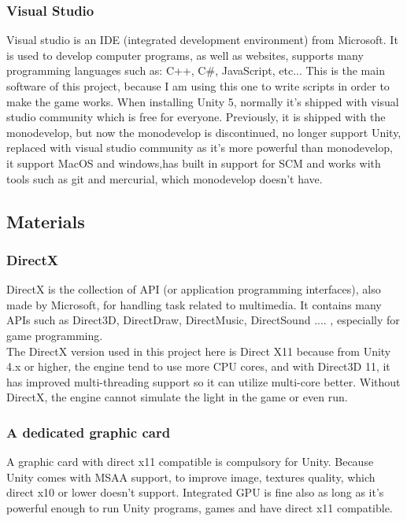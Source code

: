 \documentclass[a4paper, 13pt]{extarticle}
\begin{document}
 		 \subsubsection{Visual Studio}
 		 Visual studio is an IDE (integrated development environment) from Microsoft. It is used to develop computer programs, as well as websites, supports many programming languages such as: C++, C\#, JavaScript, etc... 
 		 This is the main software of this project, because I am using this one to write scripts in order to make the game works.
 		 When installing Unity 5, normally it's shipped with visual studio community which is free for everyone. Previously, it is shipped with the monodevelop, but now the monodevelop is discontinued, no longer support Unity, replaced with visual studio community as it's more powerful than monodevelop, it support MacOS and windows,has built in support for SCM and works with tools such as git and mercurial, which monodevelop doesn't have.  
 		
 		 
 		 
 		 \subsection{Materials}
 		 \subsubsection{DirectX}
 		 DirectX is the collection of API (or  application programming interfaces), also made by Microsoft, for handling task related to multimedia. It contains many APIs such as Direct3D, DirectDraw, DirectMusic, DirectSound .... , especially for game programming. \\[0.15cm] The DirectX version used in this project here is Direct X11 because from Unity 4.x or higher, the engine tend to use more CPU cores, and with Direct3D 11, it has improved multi-threading support so it can utilize multi-core better. Without DirectX, the engine cannot simulate the light in the game or even run. 
 		 \subsubsection{A dedicated graphic card}
 		 A graphic card with direct x11 compatible is compulsory for Unity. Because Unity comes with MSAA support, to improve image, textures quality, which direct x10 or lower doesn't support. Integrated GPU is fine also as long as it's powerful enough to run Unity programs, games and have direct x11 compatible. 
 		 
\end{document}
